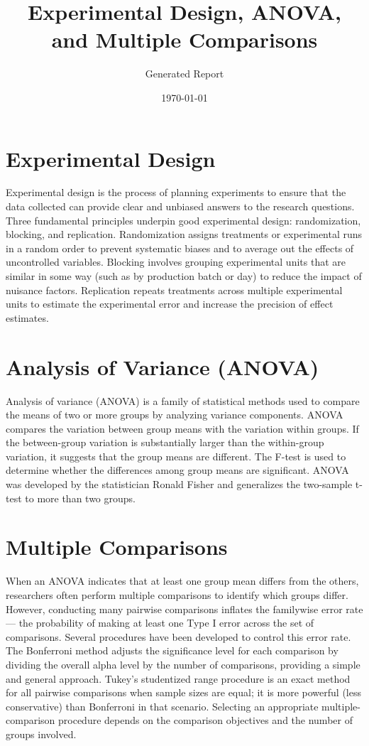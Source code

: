 \documentclass{article}
\title{Experimental Design, ANOVA, and Multiple Comparisons}
\author{Generated Report}
\date{\today}
\begin{document}
\maketitle

\section{Experimental Design}
Experimental design is the process of planning experiments to ensure that the data collected can provide clear and unbiased answers to the research questions. Three fundamental principles underpin good experimental design: randomization, blocking, and replication. Randomization assigns treatments or experimental runs in a random order to prevent systematic biases and to average out the effects of uncontrolled variables\cite{jmp_randomization}. Blocking involves grouping experimental units that are similar in some way (such as by production batch or day) to reduce the impact of nuisance factors. Replication repeats treatments across multiple experimental units to estimate the experimental error and increase the precision of effect estimates\cite{jmp_randomization}.

\section{Analysis of Variance (ANOVA)}
Analysis of variance (ANOVA) is a family of statistical methods used to compare the means of two or more groups by analyzing variance components. ANOVA compares the variation between group means with the variation within groups. If the between-group variation is substantially larger than the within-group variation, it suggests that the group means are different. The F-test is used to determine whether the differences among group means are significant\cite{wiki_anova}. ANOVA was developed by the statistician Ronald Fisher and generalizes the two-sample t-test to more than two groups\cite{wiki_anova}.

\section{Multiple Comparisons}
When an ANOVA indicates that at least one group mean differs from the others, researchers often perform multiple comparisons to identify which groups differ. However, conducting many pairwise comparisons inflates the familywise error rate — the probability of making at least one Type I error across the set of comparisons. Several procedures have been developed to control this error rate. The Bonferroni method adjusts the significance level for each comparison by dividing the overall alpha level by the number of comparisons, providing a simple and general approach\cite{psu_multiple}. Tukey's studentized range procedure is an exact method for all pairwise comparisons when sample sizes are equal; it is more powerful (less conservative) than Bonferroni in that scenario\cite{psu_multiple}. Selecting an appropriate multiple-comparison procedure depends on the comparison objectives and the number of groups involved.
\end{document}
